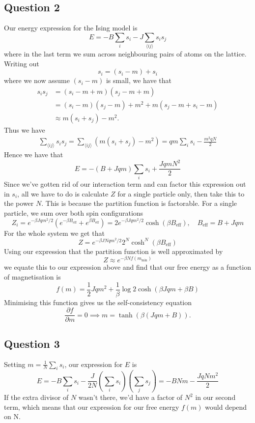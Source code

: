\documentclass[11pt, oneside]{article}   	%
\begin{document}
\subsection{Question 2}
Our energy expression for the Ising model is
\[
	E = - B \sum_i s_i - J\sum_{\langle i j \rangle} s_i s_j
\]
where in the last term we sum across neighbouring pairs of atoms on the lattice. Writing out 
\[ 
	s_i  = (s_i - m) + s_i
\]
where we now assume $(s_i - m)$ is small, we have that 
\begin{align*}
	s_i s_j &= \left( s_i - m + m \right) \left( s_j - m + m \right) \\
		   &= (s_i -m)(s_j - m) + m^2  + m (s_ j - m  + s_i  - m ) \\
		   &\approx m (s_i + s_j) - m^2. 
\end{align*}
Thus we have 
\begin{align*}
	\sum_{\langle ij \rangle} s_i s_j = \sum_{\langle i j \rangle} \left( m (s_i + s_j) - m^2 \right)  = q m \sum_i {s_i}- \frac{m^2 q N }{2}
\end{align*}
Hence we have that 
\[ 
	E = - (B + J qm )\sum_i s_i  + \frac{J q m N^2}{2}
\]
Since we've gotten rid of our interaction term and can factor this expression out in $s_i$, all we have to do is calculate $Z$ for a single particle only, then take this to the power $N$. This is because the partition function is factorable. For a single particle, we sum over both spin configurations
\[ 
	Z_i = e^{ -\beta J q m^2 / 2} \left( e^ { - \beta B_{\text{eff}}} + e^{\beta B_{\text{eff}}} \right) = 2 e^{ -\beta J q m^2 / 2} \cosh (\beta B_{\text{eff}}), \quad B_{\text{eff}} = B + J q m
\]
For the whole system we get that 
\[ 
	Z = e^{ -\beta J N q m^2 / 2}2^N \cosh^N  (\beta B_{\text{eff}})
\]
Using our expression that the partition function is well approximated by 
\[ 
	Z \approx e^{- \beta N f(m_{\min})}
\]
we equate this to our expression above and find that our free energy as a function of magnetisation is 
\[ 
	f(m) = \frac{1}{2}J q m^2 + \frac{1}{\beta} \log{2 \cosh ( {\beta J qm + \beta B }) }
\]
Minimising this function gives us the self-consistency equation 
\[ 
	\frac{\partial f }{\partial m } = 0 \implies m = \tanh (\beta(J qm + B)). 
\]

\pagebreak 
\subsection{Question 3}
Setting $m = \frac{1}{N} \sum_i s_i$, our expression for $E$ is 
\[ 
	E =  - B \sum_i s_i  - \frac{J}{2N} \left( \sum_i s_ i \right) \left( \sum_j s_j \right)  = - BNm - \frac{J q Nm^2}{2}
\]
If the extra divisor of $N$ wasn't there, we'd have a factor of $N^2$ in our second term, which means that our expression for our free energy $f(m)$ would depend on N. 
\end{document}
